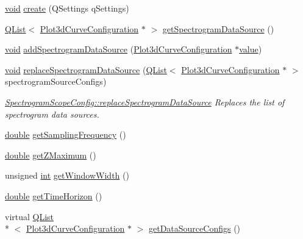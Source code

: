 \begin{DoxyCompactItemize}
\hyperlink{group___u_a_v_objects_plugin_ga444cf2ff3f0ecbe028adce838d373f5c}{void} \hyperlink{group___scope_plugin_ga764cb2be26dd64d438f6ff61da3f1c92}{create} (Q\-Settings q\-Settings)
\item 
\hyperlink{class_q_list}{Q\-List}$<$ \hyperlink{struct_plot3d_curve_configuration}{Plot3d\-Curve\-Configuration} $\ast$ $>$ \hyperlink{group___scope_plugin_ga0f006cce4d464191ee21a19fad8c8ee1}{get\-Spectrogram\-Data\-Source} ()
\item 
\hyperlink{group___u_a_v_objects_plugin_ga444cf2ff3f0ecbe028adce838d373f5c}{void} \hyperlink{group___scope_plugin_ga7c459607813f5554b33051a7a8bc0e24}{add\-Spectrogram\-Data\-Source} (\hyperlink{struct_plot3d_curve_configuration}{Plot3d\-Curve\-Configuration} $\ast$\hyperlink{glext_8h_aa0e2e9cea7f208d28acda0480144beb0}{value})
\item 
\hyperlink{group___u_a_v_objects_plugin_ga444cf2ff3f0ecbe028adce838d373f5c}{void} \hyperlink{group___scope_plugin_ga3202b61b6cde085652ea649879e48c63}{replace\-Spectrogram\-Data\-Source} (\hyperlink{class_q_list}{Q\-List}$<$ \hyperlink{struct_plot3d_curve_configuration}{Plot3d\-Curve\-Configuration} $\ast$ $>$ spectrogram\-Source\-Configs)
\begin{DoxyCompactList}\small\item\em \hyperlink{group___scope_plugin_ga3202b61b6cde085652ea649879e48c63}{Spectrogram\-Scope\-Config\-::replace\-Spectrogram\-Data\-Source} Replaces the list of spectrogram data sources. \end{DoxyCompactList}\item 
\hyperlink{_super_l_u_support_8h_a8956b2b9f49bf918deed98379d159ca7}{double} \hyperlink{group___scope_plugin_ga4fb9d3be277337c045b46845bab20f39}{get\-Sampling\-Frequency} ()
\item 
\hyperlink{_super_l_u_support_8h_a8956b2b9f49bf918deed98379d159ca7}{double} \hyperlink{group___scope_plugin_ga953b8cd98a71026b132ddace51d3111a}{get\-Z\-Maximum} ()
\item 
unsigned \hyperlink{ioapi_8h_a787fa3cf048117ba7123753c1e74fcd6}{int} \hyperlink{group___scope_plugin_ga38591d941f9fabb469887d48006a629c}{get\-Window\-Width} ()
\item 
\hyperlink{_super_l_u_support_8h_a8956b2b9f49bf918deed98379d159ca7}{double} \hyperlink{group___scope_plugin_gabf7ca6406f6b5affaf769e09e633a101}{get\-Time\-Horizon} ()
\item 
virtual \hyperlink{class_q_list}{Q\-List}\\*
$<$ \hyperlink{struct_plot3d_curve_configuration}{Plot3d\-Curve\-Configuration} $\ast$ $>$ \hyperlink{group___scope_plugin_ga20cd38fb6f34eae6a7a5c9e18a2184ba}{get\-Data\-Source\-Configs} ()

\end{DoxyCompactItemize}
